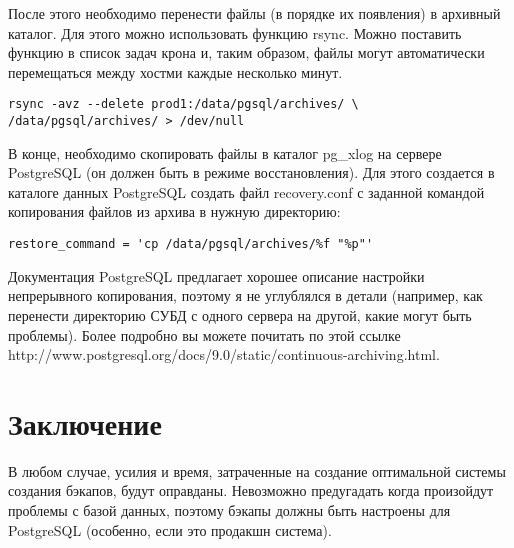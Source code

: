 После этого необходимо перенести файлы (в порядке их появления) в архивный каталог. 
Для этого можно использовать функцию rsync.
Можно поставить функцию в список задач крона и, таким образом, файлы могут автоматически перемещаться между 
хостми каждые несколько минут.
\begin{lstlisting}[label=lst:backups16,caption=Копирование WAL файлов на другой хост]
rsync -avz --delete prod1:/data/pgsql/archives/ \
/data/pgsql/archives/ > /dev/null
\end{lstlisting}

В конце, необходимо скопировать файлы в каталог pg\_xlog на сервере PostgreSQL (он должен быть в режиме восстановления). 
Для этого создается в каталоге данных PostgreSQL создать файл recovery.conf с заданной командой копирования 
файлов из архива в нужную директорию:
\begin{lstlisting}[label=lst:backups17,caption=recovery.conf]
restore_command = 'cp /data/pgsql/archives/%f "%p"'
\end{lstlisting}

Документация PostgreSQL предлагает хорошее описание настройки непрерывного копирования, поэтому я не углублялся в детали 
(например, как перенести директорию СУБД с одного сервера на другой, какие могут быть проблемы). Более подробно вы 
можете почитать по этой ссылке http://www.postgresql.org/docs/9.0/static/continuous-archiving.html.

\section{Заключение}
В любом случае, усилия и время, затраченные на создание оптимальной системы создания бэкапов, будут оправданы. 
Невозможно предугадать когда произойдут проблемы с базой данных, поэтому бэкапы должны быть настроены для PostgreSQL 
(особенно, если это продакшн система).